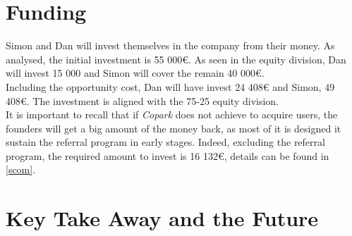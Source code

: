 \documentclass[12pt,a4paper,oneside]{book}
\newcommand{\bp}{\textit{Copark }}
\begin{document}
\section{Funding}
Simon and Dan will invest themselves in the company from their money. As analysed, the initial investment is 55 000\euro{}. As seen in the equity division, Dan will invest 15 000 and Simon will cover the remain 40 000\euro{}.\\

Including the opportunity cost, Dan will have invest 24 408\euro{} and Simon, 49 408\euro{}. The investment is aligned with the 75-25 equity division.\\

It is important to recall that if \bp does not achieve to acquire users, the founders will get a big amount of the money back, as most of it is designed it sustain the referral program in early stages. Indeed, excluding the referral program, the required amount to invest is 16 132\euro{}, details can be found in \autoref{scom}.

\section{Key Take Away and the Future}
\end{document}

